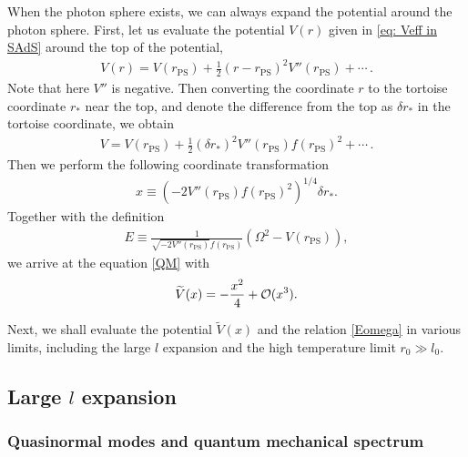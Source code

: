 \documentclass[a4paper,11pt]{article}
\begin{document}
When the photon sphere exists, we can always expand the potential around the photon sphere. 
First, let us evaluate the potential $V(r)$ given in \eqref{eq: Veff in SAdS} around the top of the potential,
\begin{align}
    V(r) = V(r_\mathrm{PS}) + \frac12 (r-r_\mathrm{PS})^2 V''(r_\mathrm{PS}) + \cdots \, .
\end{align}
Note that here $V''$ is negative.
Then converting the coordinate $r$ to the tortoise coordinate $r_*$ near the top, and denote the difference 
from the top as $\delta r_*$ in the tortoise coordinate, we obtain
\begin{align}
    V = V(r_\mathrm{PS}) + \frac12 (\delta r_*)^2 V''(r_\mathrm{PS}) f(r_\mathrm{PS})^2 + \cdots \, .
\end{align}
Then we perform the following coordinate transformation
\begin{align}
    x \equiv \left(-2V''(r_\mathrm{PS}) f(r_\mathrm{PS})^2\right)^{1/4} \delta r_* .
    \label{def of x}
\end{align}
Together with the definition
\begin{align}
    E \equiv \frac1{\sqrt{-2V''(r_\mathrm{PS})} f(r_\mathrm{PS})}\left(\Omega^2 - V(r_\mathrm{PS})\right) ,
    \label{Eomega}
\end{align}
we arrive at the equation \eqref{QM} with 
\begin{align}
    \widetilde{V}(x) = - \frac{x^2}{4} + {\cal O} (x^3) .
\end{align}

Next, we shall evaluate the potential $\widetilde{V}(x)$ and the relation \eqref{Eomega} in various limits,
including the large $l$ expansion and the high temperature limit $r_0 \gg l_0$.

\subsection{Large \texorpdfstring{$l$}{TEXT} expansion}

\subsubsection{Quasinormal modes and quantum mechanical spectrum}
\end{document}

